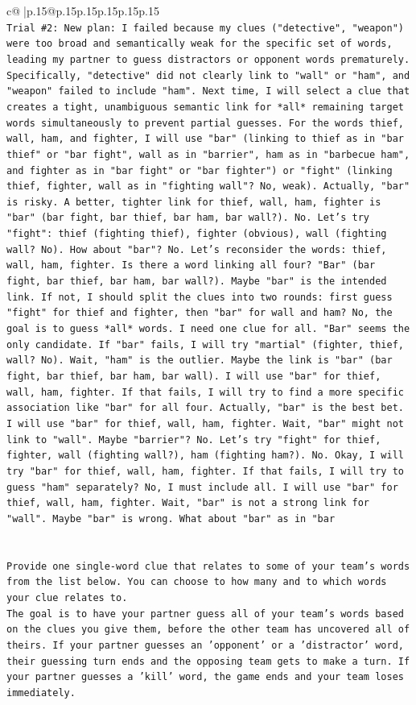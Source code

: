 \documentclass{article}
\begin{document}
{\begin{supertabular}{c@{$\;$}|p{.15\linewidth}@{}p{.15\linewidth}p{.15\linewidth}p{.15\linewidth}p{.15\linewidth}p{.15\linewidth}}
{{{\\ 
\texttt{Trial \#2: New plan: I failed because my clues ("detective", "weapon") were too broad and semantically weak for the specific set of words, leading my partner to guess distractors or opponent words prematurely. Specifically, "detective" did not clearly link to "wall" or "ham", and "weapon" failed to include "ham". Next time, I will select a clue that creates a tight, unambiguous semantic link for *all* remaining target words simultaneously to prevent partial guesses. For the words thief, wall, ham, and fighter, I will use "bar" (linking to thief as in "bar thief" or "bar fight", wall as in "barrier", ham as in "barbecue ham", and fighter as in "bar fight" or "bar fighter") or "fight" (linking thief, fighter, wall as in "fighting wall"? No, weak). Actually, "bar" is risky. A better, tighter link for thief, wall, ham, fighter is "bar" (bar fight, bar thief, bar ham, bar wall?). No. Let's try "fight": thief (fighting thief), fighter (obvious), wall (fighting wall? No). How about "bar"? No. Let's reconsider the words: thief, wall, ham, fighter. Is there a word linking all four? "Bar" (bar fight, bar thief, bar ham, bar wall?). Maybe "bar" is the intended link. If not, I should split the clues into two rounds: first guess "fight" for thief and fighter, then "bar" for wall and ham? No, the goal is to guess *all* words. I need one clue for all. "Bar" seems the only candidate. If "bar" fails, I will try "martial" (fighter, thief, wall? No). Wait, "ham" is the outlier. Maybe the link is "bar" (bar fight, bar thief, bar ham, bar wall). I will use "bar" for thief, wall, ham, fighter. If that fails, I will try to find a more specific association like "bar" for all four. Actually, "bar" is the best bet. I will use "bar" for thief, wall, ham, fighter. Wait, "bar" might not link to "wall". Maybe "barrier"? No. Let's try "fight" for thief, fighter, wall (fighting wall?), ham (fighting ham?). No. Okay, I will try "bar" for thief, wall, ham, fighter. If that fails, I will try to guess "ham" separately? No, I must include all. I will use "bar" for thief, wall, ham, fighter. Wait, "bar" is not a strong link for "wall". Maybe "bar" is wrong. What about "bar" as in "bar} \\
\\ 
\\ 
\texttt{Provide one single{-}word clue that relates to some of your team's words from the list below. You can choose to how many and to which words your clue relates to.} \\
\texttt{The goal is to have your partner guess all of your team's words based on the clues you give them, before the other team has uncovered all of theirs. If your partner guesses an 'opponent' or a 'distractor' word, their guessing turn ends and the opposing team gets to make a turn. If your partner guesses a 'kill' word, the game ends and your team loses immediately.} \\
}}}
\end{supertabular}}
\end{document}
